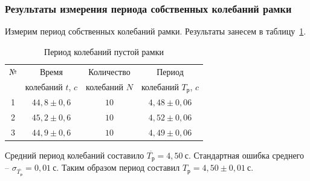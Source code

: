 \documentclass[a4paper,11pt]{article}
\begin{document}
\subsubsection{Результаты измерения периода собственных колебаний рамки} %
Измерим период собственных колебаний рамки. Результаты занесем в таблицу~\ref{table:tab2}.
\begin{table}[h!]
\centering
\begin{tabular}{ ||c|c|c|c|| }
  \hline
  № & Время & Количество & Период \\
   & колебаний $t$, $c$ & колебаний $N$ & колебаний $T_{р}$, $c$ \\
  \hline
  1 & $44,8 \pm 0,6$ & $10$ & $4,48 \pm 0,06$ \\
  2 & $45,2 \pm 0,6$ & $10$ & $4,52 \pm 0,06$ \\
  3 & $44,9 \pm 0,6$ & $10$ & $4,49 \pm 0,06$ \\
  \hline
\end{tabular}
\caption{Период колебаний пустой рамки}
\label{table:tab2}
\end{table}\newline
Средний период колебаний составило $\overline{T_{р}} = 4,50\ с$.\newline
Стандартная ошибка среднего -- $\sigma_{\overline{T_{р}}} = 0,01\ с$.\newline
Таким образом период составил $T_{р} = 4,50 \pm 0,01\ с$.
\end{document}

